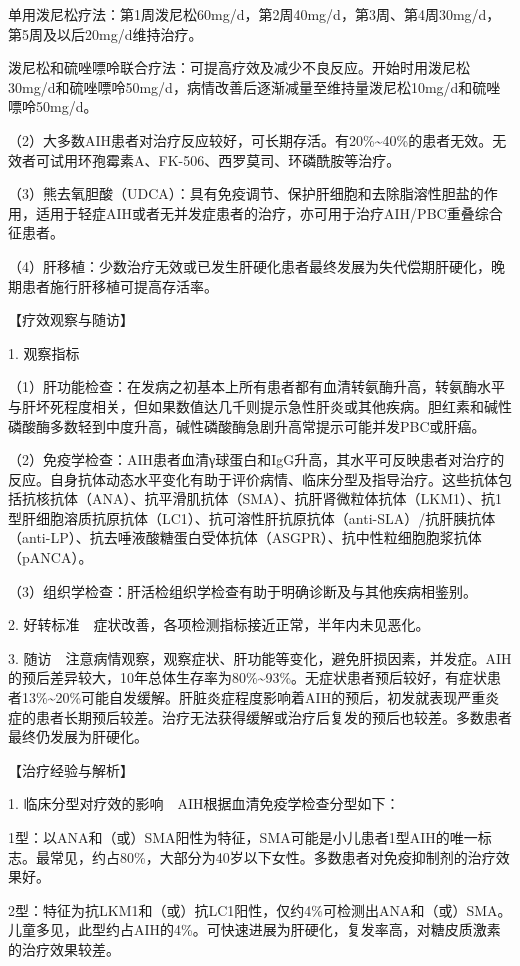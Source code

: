 单用泼尼松疗法：第1周泼尼松60mg/d，第2周40mg/d，第3周、第4周30mg/d，第5周及以后20mg/d维持治疗。

泼尼松和硫唑嘌呤联合疗法：可提高疗效及减少不良反应。开始时用泼尼松30mg/d和硫唑嘌呤50mg/d，病情改善后逐渐减量至维持量泼尼松10mg/d和硫唑嘌呤50mg/d。

（2）大多数AIH患者对治疗反应较好，可长期存活。有20\%\textasciitilde{}40\%的患者无效。无效者可试用环孢霉素A、FK-506、西罗莫司、环磷酰胺等治疗。

（3）熊去氧胆酸（UDCA）：具有免疫调节、保护肝细胞和去除脂溶性胆盐的作用，适用于轻症AIH或者无并发症患者的治疗，亦可用于治疗AIH/PBC重叠综合征患者。

（4）肝移植：少数治疗无效或已发生肝硬化患者最终发展为失代偿期肝硬化，晚期患者施行肝移植可提高存活率。

【疗效观察与随访】

1. 观察指标

（1）肝功能检查：在发病之初基本上所有患者都有血清转氨酶升高，转氨酶水平与肝坏死程度相关，但如果数值达几千则提示急性肝炎或其他疾病。胆红素和碱性磷酸酶多数轻到中度升高，碱性磷酸酶急剧升高常提示可能并发PBC或肝癌。

（2）免疫学检查：AIH患者血清γ球蛋白和IgG升高，其水平可反映患者对治疗的反应。自身抗体动态水平变化有助于评价病情、临床分型及指导治疗。这些抗体包括抗核抗体（ANA）、抗平滑肌抗体（SMA）、抗肝肾微粒体抗体（LKM1）、抗1型肝细胞溶质抗原抗体（LC1）、抗可溶性肝抗原抗体（anti-SLA）/抗肝胰抗体（anti-LP）、抗去唾液酸糖蛋白受体抗体（ASGPR）、抗中性粒细胞胞浆抗体（pANCA）。

（3）组织学检查：肝活检组织学检查有助于明确诊断及与其他疾病相鉴别。

2. 好转标准　症状改善，各项检测指标接近正常，半年内未见恶化。

3.
随访　注意病情观察，观察症状、肝功能等变化，避免肝损因素，并发症。AIH的预后差异较大，10年总体生存率为80\%\textasciitilde{}93\%。无症状患者预后较好，有症状患者13\%\textasciitilde{}20\%可能自发缓解。肝脏炎症程度影响着AIH的预后，初发就表现严重炎症的患者长期预后较差。治疗无法获得缓解或治疗后复发的预后也较差。多数患者最终仍发展为肝硬化。

【治疗经验与解析】

1. 临床分型对疗效的影响　AIH根据血清免疫学检查分型如下：

1型：以ANA和（或）SMA阳性为特征，SMA可能是小儿患者1型AIH的唯一标志。最常见，约占80\%，大部分为40岁以下女性。多数患者对免疫抑制剂的治疗效果好。

2型：特征为抗LKM1和（或）抗LC1阳性，仅约4\%可检测出ANA和（或）SMA。儿童多见，此型约占AIH的4\%。可快速进展为肝硬化，复发率高，对糖皮质激素的治疗效果较差。

